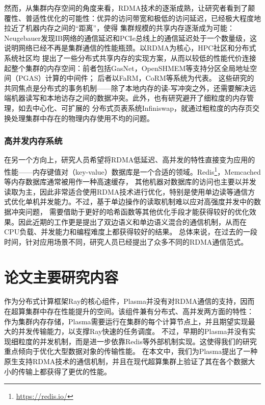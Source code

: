 然而，从集群内存空间的角度来看，RDMA技术的逐渐成熟，让研究者看到了颠覆性、普适性优化的可能性：优异的访问带宽和极低的访问延迟，已经极大程度地拉近了机器内存之间的“距离”，使得
集群规模的共享内存逐渐成为可能：Neugebauer\cite{neugebauer2018understanding}发现IB网络的通信延迟和PCIe总线上的通信延迟处于一个数量级，这说明网络已经不再是集群通信的性能瓶颈。以RDMA为核心，HPC社区和分布式系统社区均
提出了一些分布式共享内存的实现方案，从而以较低的性能代价连接起整个集群的内存空间：前者包括GasNet\cite{bonachea2017gasnet}，OpenSHMEM\cite{chapman2010introducing}等支持分区全局地址空间（PGAS）计算的中间件；
后者以FaRM\cite{dragojevic2014farm}，CoRM\cite{taranov2021corm}等系统为代表。
这些研究的共同焦点是分布式的事务机制——除了本地内存的读-写冲突之外，还需要解决远端机器读写和本地访存之间的数据冲突。此外，也有研究避开了细粒度的内存管理，如去中心化、可扩展的
分布式页表系统Infiniswap\cite{gu2017efficient}，就通过粗粒度的内存页交换处理集群中存在的物理内存使用不均的问题。

\subsubsection{高并发内存系统}

在另一个方向上，研究人员希望将RDMA低延迟、高并发的特性直接变为应用的性能——内存键值对（key-value）数据库是一个合适的领域。Redis\footnote{\url{https://redis.io/}}，Memcached\cite{jose2011memcached}等内存数据库通常被用作一种高速缓存，
其他机器对数据库的访问也主要以并发读取为主，因此非常适合使用RDMA技术进行优化，特别是使用单边读等通信方式优化单机并发能力\cite{mitchell2013using}。不过，基于单边操作的读取机制难以应对高强度并发中的数据冲突问题，
需要借助于更好的哈希函数等其他优化手段才能获得较好的优化效果。因此近期的工作更是提出了双边语义和单边语义混合的通信机制\cite{kalia2014using}\cite{su2017rfp}，从而在CPU负载、并发能力和编程难度上都获得较好的结果。
总体来说，在过去的一段时间，针对应用场景不同，研究人员已经提出了众多不同的RDMA通信范式\cite{li2021hatrpc}。

\section{论文主要研究内容}

作为分布式计算框架Ray的核心组件，Plasma并没有对RDMA通信的支持，因而在超算集群中存在性能提升的空间。该组件兼有分布式、高并发两方面的特性：
作为集群内存存储，Plasma需要运行在集群的每个计算节点上，并且期望实现最大的并发传输能力，以支撑Ray快速的任务调度。
不过，早期的Plasma并没有实现细粒度的并发机制，而是进一步依靠Redis等外部机制实现。这使得我们的研究重点倾向于优化大型数据对象的传输性能。
在本文中，我们为Plasma提出了一种原生支持RDMA技术的通信机制，并且在现代超算集群上验证了其在各个数据大小的传输上都获得了更优的性能。

